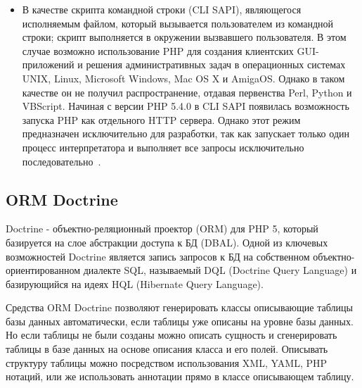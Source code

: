 \begin{itemize}
    \item   В качестве скрипта командной строки (CLI SAPI), являющегося исполняемым файлом, который вызывается пользователем из командной строки; скрипт выполняется в окружении вызвавшего пользователя. В этом случае возможно использование PHP для создания клиентских GUI-приложений и решения административных задач в операционных системах UNIX, Linux, Microsoft Windows, Mac OS X и AmigaOS. Однако в таком качестве он не получил распространение, отдавая первенства Perl, Python и VBScript.
    Начиная с версии PHP 5.4.0 в CLI SAPI появилась возможность запуска PHP как отдельного HTTP сервера. Однако этот режим предназначен исключительно для разработки, так как запускает только один процесс интерпретатора и выполняет все запросы исключительно последовательно~\cite{php_documents}.
\end{itemize}

\subsection{ORM Doctrine}
\label{sub:practice:doctrine}
Doctrine - объектно-реляционный проектор (ORM) для PHP 5, который базируется на слое абстракции доступа к БД (DBAL). Одной из ключевых возможностей Doctrine является запись запросов к БД на собственном объектно-ориентированном диалекте SQL, называемый DQL (Doctrine Query Language) и базирующийся на идеях HQL (Hibernate Query Language).

Средства ORM Doctrine позволяют генерировать классы описывающие таблицы базы данных автоматически, если таблицы уже описаны на уровне базы данных. Но если таблицы не были созданы можно описать сущность и сгенерировать таблицы в базе данных на основе описания класса и его полей. Описывать структуру таблицы можно посредством использования XML, YAML, PHP нотаций, или же использовать аннотации прямо в классе описывающем таблицу. 

